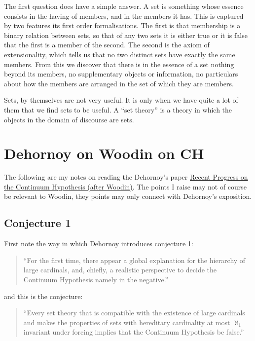 The first question does have a simple answer.
A set is something whose essence consists in the having of members, and in the members it has.
This is captured by two features its first order formalisations.
The first is that membership is a binary relation between sets, so that of any two sets it is either true or it is false that the first is a member of the second.
The second is the axiom of extensionality, which tells us that no two distinct sets have exactly the same members.
From this we discover that there is in the essence of a set nothing beyond its members, no supplementary objects or information, no particulars about how the members are arranged in the set of which they are members. 

Sets, by themselves are not very useful.
It is only when we have quite a lot of them that we find sets to be useful.
A ``set theory'' is a theory in which the objects in the domain of discourse are sets.

\section{Dehornoy on Woodin on CH}

The following are my notes on reading the Dehornoy's paper \href{http://www.math.unicaen.fr/~dehornoy/Surveys/DgtUS.pdf}{Recent Progress on the Continuum Hypothesis (after Woodin)}.
The points I raise may not of course be relevant to Woodin, they points may only connect with Dehornoy's exposition.

\subsection{Conjecture 1}

First note the way in which Dehornoy introduces conjecture 1:

\begin{quote}
``For the first time, there appear a global explanation for the hierarchy of large cardinals, and, chiefly, a
realistic perspective to decide the Continuum Hypothesis namely in the negative.''
\end{quote}

and this is the conjecture:

\begin{quote}
``Every set theory that is compatible with the existence of large cardinals
and makes the properties of sets with hereditary cardinality at most $\aleph_1$ invariant under forcing
implies that the Continuum Hypothesis be false.''
\end{quote}

